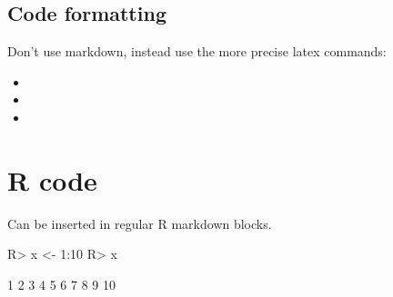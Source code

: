 \documentclass[article]{jss}
\providecommand{\tightlist}{%
  \setlength{\itemsep}{0pt}\setlength{\parskip}{0pt}}
\begin{document}
\subsection{Code formatting}\label{code-formatting}

Don't use markdown, instead use the more precise latex commands:

\begin{itemize}
\tightlist
\item
\item
\item
\end{itemize}

\section{R code}\label{r-code}

Can be inserted in regular R markdown blocks.

\begin{CodeChunk}
\begin{CodeInput}
R> x <- 1:10
R> x
\end{CodeInput}
\begin{CodeOutput}
 [1]  1  2  3  4  5  6  7  8  9 10
\end{CodeOutput}
\end{CodeChunk}
\end{document}
